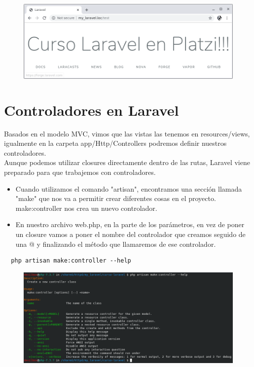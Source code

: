 \documentclass{article}
\begin{document}
\begin{figure}[h!]
  \centering
  \includegraphics[scale=0.5]{./Pictures/009_blade.png}
\end{figure}

\section{Controladores en Laravel}%
Basados en el modelo MVC, vimos que las vistas las tenemos en resources/views,
igualmente en la carpeta app/Http/Controllers podremos definir nuestros
controladores.\\
Aunque podemos utilizar closures directamente dentro de las rutas, Laravel
viene preparado para que trabajemos con controladores.\\

\begin{itemize}
  \item Cuando utilizamos el comando "artisan", encontramos una sección llamada
    "make" que nos va a permitir crear diferentes cosas en el proyecto.
    make:controller nos crea un nuevo controlador.
  \item En nuestro archivo web.php, en la parte de los parámetros, en vez de
    poner un closure vamos a poner el nombre del controlador que creamos
    seguido de una @ y finalizando el método que llamaremos de ese controlador.
\end{itemize}

\begin{verbatim}
  php artisan make:controller --help
\end{verbatim}

\begin{figure}[h!]
  \centering
  \includegraphics[scale=0.5]{./Pictures/010_artisan_make_controller.png}
\end{figure}
\end{document}
